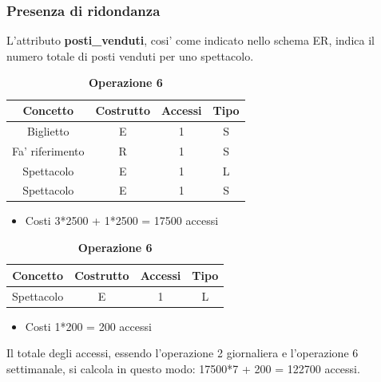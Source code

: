 \documentclass[10pt]{article}
\begin{document}
	\subsubsection{Presenza di ridondanza}
	L'attributo \textbf{posti\_venduti}, cosi' come indicato nello schema ER, indica il numero totale di posti venduti per uno spettacolo.
	\begin{table}[h!]
		\centering
		\caption{\textbf{Operazione 2}} \label{tab:sometab}
		\begin{tabular}{|c|c|c|c|}
			\hline
			\textbf{Concetto} & \textbf{Costrutto} & \textbf{Accessi} & \textbf{Tipo} \\
			\hline
			Biglietto & E & 1 & S \\
			\hline
			Fa' riferimento & R & 1 & S \\
			\hline
			Spettacolo & E & 1 & L \\
			\hline
			Spettacolo & E & 1 & S \\
			\hline
		\end{tabular}
		\begin{itemize}
			\item Costi 3*2500 + 1*2500 = 17500 accessi 
		\end{itemize}
		\caption{\textbf{Operazione 6}} \label{tab:sometab}
		\begin{tabular}{|c|c|c|c|}
			\hline
			\textbf{Concetto} & \textbf{Costrutto} & \textbf{Accessi} & \textbf{Tipo} \\
			\hline
			Spettacolo & E & 1 & L \\
			\hline
		\end{tabular}
		\begin{itemize}
		\item Costi 1*200 = 200 accessi 
		\end{itemize}
	\end{table}
	Il totale degli accessi, essendo l'operazione 2 giornaliera e l'operazione 6 settimanale, si calcola in questo modo: 17500*7 + 200 = 122700 accessi.
\end{document}
